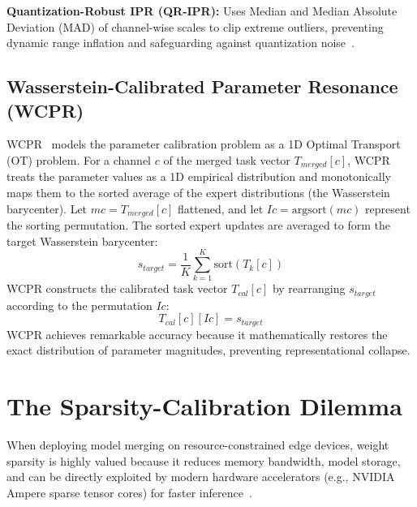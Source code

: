 \documentclass{article}
\theoremstyle{plain}
\theoremstyle{definition}
\theoremstyle{remark}
\begin{document}
\textbf{Quantization-Robust IPR (QR-IPR):} Uses Median and Median Absolute Deviation (MAD) of channel-wise scales to clip extreme outliers, preventing dynamic range inflation and safeguarding against quantization noise~\cite{submission5}.

\subsection{Wasserstein-Calibrated Parameter Resonance (WCPR)}
WCPR~\cite{submission9} models the parameter calibration problem as a 1D Optimal Transport (OT) problem. For a channel $c$ of the merged task vector $T_{merged}[c]$, WCPR treats the parameter values as a 1D empirical distribution and monotonically maps them to the sorted average of the expert distributions (the Wasserstein barycenter).
Let $mc = T_{merged}[c]$ flattened, and let $Ic = \text{argsort}(mc)$ represent the sorting permutation. The sorted expert updates are averaged to form the target Wasserstein barycenter:
\begin{equation}
    s_{target} = \frac{1}{K} \sum_{k=1}^K \text{sort}(T_k[c])
\end{equation}
WCPR constructs the calibrated task vector $T_{cal}[c]$ by rearranging $s_{target}$ according to the permutation $Ic$:
\begin{equation}
    T_{cal}[c][Ic] = s_{target}
\end{equation}
WCPR achieves remarkable accuracy because it mathematically restores the exact distribution of parameter magnitudes, preventing representational collapse.

\section{The Sparsity-Calibration Dilemma}
\label{sec:dilemma}

When deploying model merging on resource-constrained edge devices, weight sparsity is highly valued because it reduces memory bandwidth, model storage, and can be directly exploited by modern hardware accelerators (e.g., NVIDIA Ampere sparse tensor cores) for faster inference~\cite{han15compression}.
\end{document}
